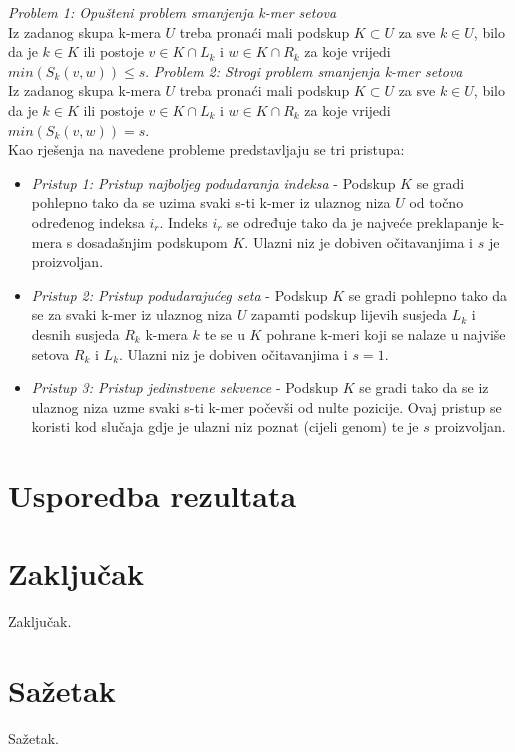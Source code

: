 \documentclass[times, utf8, seminar, numeric]{fer}
\begin{document}
\textit{Problem 1: Opušteni problem smanjenja k-mer setova}\nopagebreak\\
Iz zadanog skupa k-mera {$U$} treba pronaći mali podskup {$K \subset U$} za sve
{$k \in U$}, bilo da je {$k \in K$} ili postoje {$v \in K \cap L_k$} i
{$w \in K \cap R_k$} za koje vrijedi {$min(S_k(v,w)) \leq s$}.
\textit{Problem 2: Strogi problem smanjenja k-mer setova}\nopagebreak\\
Iz zadanog skupa k-mera {$U$} treba pronaći mali podskup {$K \subset U$} za sve
{$k \in U$}, bilo da je {$k \in K$} ili postoje {$v \in K \cap L_k$} i
{$w \in K \cap R_k$} za koje vrijedi {$min(S_k(v,w)) = s$}.\\
Kao rješenja na navedene probleme predstavljaju se tri pristupa:
\begin{itemize}
  \item{\textit{Pristup 1: Pristup najboljeg podudaranja indeksa} - Podskup {$K$}
  se gradi pohlepno tako da se uzima svaki s-ti k-mer iz ulaznog niza {$U$} od točno
  određenog indeksa {$i_r$}. Indeks {$i_r$} se određuje tako da je najveće
  preklapanje k-mera s dosadašnjim podskupom {$K$}. Ulazni niz je dobiven
  očitavanjima i {$s$} je proizvoljan.}
  \item{\textit{Pristup 2: Pristup podudarajućeg seta} - Podskup {$K$}
  se gradi pohlepno tako da se za svaki k-mer iz ulaznog niza {$U$} zapamti
  podskup lijevih susjeda {$L_k$} i desnih susjeda {$R_k$} k-mera {$k$} te se u
  {$K$} pohrane k-meri koji se nalaze u najviše setova {$R_k$} i {$L_k$}.
  Ulazni niz je dobiven očitavanjima i {$s = 1$}.}
  \item{\textit{Pristup 3: Pristup jedinstvene sekvence} - Podskup {$K$} se gradi
  tako da se iz ulaznog niza uzme svaki s-ti k-mer počevši od nulte pozicije.
  Ovaj pristup se koristi kod slučaja gdje je ulazni niz poznat (cijeli genom) te
  je {$s$} proizvoljan.}
\end{itemize}

\chapter{Usporedba rezultata}

\chapter{Zaključak}
Zaključak.




\chapter{Sažetak}
Sažetak.
\end{document}
